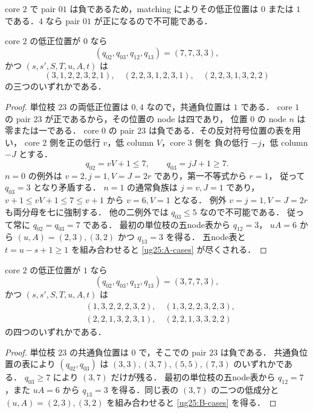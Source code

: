 core $2$ で pair $01$ は負であるため，matching によりその低正位置は
$0$ または $1$ である．$4$ なら pair $01$ が正になるので不可能である．

\begin{lemma}\label{ug25:case-A}
core $2$ の低正位置が $0$ なら
\[
 (q_{02},q_{03},q_{12},q_{13})=(7,7,3,3),
\]
かつ $(s,s',S,T,u,A,t)$ は
\begin{equation}\label{ug25:A-cases}
 (3,1,2,2,3,2,1),\quad
 (2,2,3,1,2,3,1),\quad
 (2,2,3,1,3,2,2)
\end{equation}
の三つのいずれかである．
\end{lemma}

\begin{proof}
単位枝 $23$ の両低正位置は $0,4$ なので，共通負位置は $1$ である．
core $1$ の pair $23$ が正であるから，その位置の node は四であり，
位置 $0$ の node $n$ は零または一である．
core $0$ の pair $23$ は負である．その反対符号位置の表を用い，
core $2$ 側を正の低行 $v$，低 column $V$，core $3$ 側を
負の低行 $-j$，低 column $-J$ とする．
\[
 q_{02}=vV+1\le7,\qquad q_{03}=jJ+1\ge7.
\]
$n=0$ の例外は $v=2,j=1,V=J=2r$ であり，第一不等式から $r=1$，
従って $q_{03}=3$ となり矛盾する．
$n=1$ の通常負族は $j=v,J=1$ であり，
$v+1\le vV+1\le7\le v+1$ から $v=6,V=1$ となる．
例外 $v=j=1,V=J=2r$ も両分母を七に強制する．
他の二例外では $q_{03}\le5$ なので不可能である．
従って常に $q_{02}=q_{03}=7$ である．
最初の単位枝の五node表から $q_{12}=3$，
$uA=6$ から $(u,A)=(2,3),(3,2)$ かつ $q_{13}=3$ を得る．
五node表と $t=u-s+1\ge1$ を組み合わせると
\eqref{ug25:A-cases} が尽くされる．
\end{proof}

\begin{lemma}\label{ug25:case-B}
core $2$ の低正位置が $1$ なら
\[
 (q_{02},q_{03},q_{12},q_{13})=(3,7,7,3),
\]
かつ $(s,s',S,T,u,A,t)$ は
\begin{equation}\label{ug25:B-cases}
 \begin{split}
 &(1,3,2,2,2,3,2),\quad (1,3,2,2,3,2,3),\\
 &(2,2,1,3,2,3,1),\quad (2,2,1,3,3,2,2)
 \end{split}
\end{equation}
の四つのいずれかである．
\end{lemma}

\begin{proof}
単位枝 $23$ の共通負位置は $0$ で，そこでの pair $23$ は負である．
共通負位置の表により $(q_{02},q_{03})$ は
$(3,3),(3,7),(5,5),(7,3)$ のいずれかである．
$q_{03}\ge7$ により $(3,7)$ だけが残る．
最初の単位枝の五node表から $q_{12}=7$，また $uA=6$ から
$q_{13}=3$ を得る．同じ表の $(3,7)$ の二つの低成分と
$(u,A)=(2,3),(3,2)$ を組み合わせると
\eqref{ug25:B-cases} を得る．
\end{proof}

